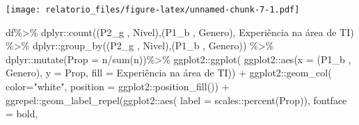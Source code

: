 \documentclass[
]{article}
\newenvironment{Shaded}{\begin{snugshade}}{\end{snugshade}}
\newcommand{\AttributeTok}[1]{\textcolor[rgb]{0.77,0.63,0.00}{#1}}
\newcommand{\FunctionTok}[1]{\textcolor[rgb]{0.00,0.00,0.00}{#1}}
\newcommand{\NormalTok}[1]{#1}
\newcommand{\SpecialCharTok}[1]{\textcolor[rgb]{0.00,0.00,0.00}{#1}}
\newcommand{\StringTok}[1]{\textcolor[rgb]{0.31,0.60,0.02}{#1}}
\begin{document}
\texttt{[image: relatorio\_files/figure-latex/unnamed-chunk-7-1.pdf]}

\begin{Shaded}
\begin{Highlighting}[]
\NormalTok{df}\SpecialCharTok{\%\textgreater{}\%}
\NormalTok{  dplyr}\SpecialCharTok{::}\FunctionTok{count}\NormalTok{(}\StringTok{\textasciigrave{}}\AttributeTok{(\textquotesingle{}P2\_g \textquotesingle{}, \textquotesingle{}Nivel\textquotesingle{})}\StringTok{\textasciigrave{}}\NormalTok{,}\StringTok{\textasciigrave{}}\AttributeTok{(\textquotesingle{}P1\_b \textquotesingle{}, \textquotesingle{}Genero\textquotesingle{})}\StringTok{\textasciigrave{}}\NormalTok{, }\StringTok{\textasciigrave{}}\AttributeTok{Experiência na área de TI}\StringTok{\textasciigrave{}}\NormalTok{) }\SpecialCharTok{\%\textgreater{}\%}
\NormalTok{  dplyr}\SpecialCharTok{::}\FunctionTok{group\_by}\NormalTok{(}\StringTok{\textasciigrave{}}\AttributeTok{(\textquotesingle{}P2\_g \textquotesingle{}, \textquotesingle{}Nivel\textquotesingle{})}\StringTok{\textasciigrave{}}\NormalTok{,}\StringTok{\textasciigrave{}}\AttributeTok{(\textquotesingle{}P1\_b \textquotesingle{}, \textquotesingle{}Genero\textquotesingle{})}\StringTok{\textasciigrave{}}\NormalTok{) }\SpecialCharTok{\%\textgreater{}\%}
\NormalTok{  dplyr}\SpecialCharTok{::}\FunctionTok{mutate}\NormalTok{(}\AttributeTok{Prop =}\NormalTok{ n}\SpecialCharTok{/}\FunctionTok{sum}\NormalTok{(n))}\SpecialCharTok{\%\textgreater{}\%}
\NormalTok{  ggplot2}\SpecialCharTok{::}\FunctionTok{ggplot}\NormalTok{(}
\NormalTok{    ggplot2}\SpecialCharTok{::}\FunctionTok{aes}\NormalTok{(}\AttributeTok{x =} \StringTok{\textasciigrave{}}\AttributeTok{(\textquotesingle{}P1\_b \textquotesingle{}, \textquotesingle{}Genero\textquotesingle{})}\StringTok{\textasciigrave{}}\NormalTok{, }\AttributeTok{y =}\NormalTok{ Prop,}
                 \AttributeTok{fill =} \StringTok{\textasciigrave{}}\AttributeTok{Experiência na área de TI}\StringTok{\textasciigrave{}}\NormalTok{)) }\SpecialCharTok{+}
\NormalTok{  ggplot2}\SpecialCharTok{::}\FunctionTok{geom\_col}\NormalTok{( }\AttributeTok{color=}\StringTok{"white"}\NormalTok{,}
                     \AttributeTok{position =}\NormalTok{ ggplot2}\SpecialCharTok{::}\FunctionTok{position\_fill}\NormalTok{()) }\SpecialCharTok{+}
\NormalTok{  ggrepel}\SpecialCharTok{::}\FunctionTok{geom\_label\_repel}\NormalTok{(ggplot2}\SpecialCharTok{::}\FunctionTok{aes}\NormalTok{(}
    \AttributeTok{label =}\NormalTok{ scales}\SpecialCharTok{::}\FunctionTok{percent}\NormalTok{(Prop)),}
    \AttributeTok{fontface =} \StringTok{\textquotesingle{}bold\textquotesingle{}}\NormalTok{,}

\end{Highlighting}
\end{Shaded}
\end{document}
